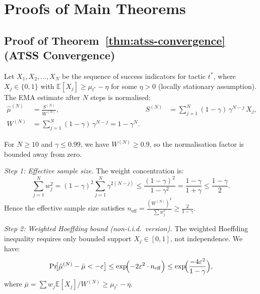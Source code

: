 \documentclass[conference]{IEEEtran}
\begin{document}




\appendix

\section{Proofs of Main Theorems}
\label{app:proofs}

\subsection{Proof of Theorem~\ref{thm:atss-convergence} (ATSS Convergence)}

Let $X_1, X_2, \ldots, X_N$ be the sequence of success indicators
for tactic $t^*$, where $X_j \in \{0,1\}$ with
$\mathbb{E}[X_j] \geq \mu_{t^*} - \eta$ for some $\eta > 0$
(locally stationary assumption).  The EMA estimate after $N$ steps
is normalised:
\begin{equation}
  \begin{aligned}
  \hat{\mu}^{(N)} &= \frac{S^{(N)}}{W^{(N)}}, &
  S^{(N)} &= \sum_{j=1}^{N} (1{-}\gamma)\,\gamma^{N-j}\,X_j, \\
  W^{(N)} &= \sum_{j=1}^{N} (1{-}\gamma)\,\gamma^{N-j}
    = 1 - \gamma^N.
  \end{aligned}
\end{equation}

For $N \geq 10$ and $\gamma \leq 0.99$, we have $W^{(N)} \geq 0.9$,
so the normalisation factor is bounded away from zero.

\emph{Step 1: Effective sample size.}
The weight concentration is:
\[
  \sum_{j=1}^{N} w_j^2
  = (1{-}\gamma)^2 \sum_{j=1}^{N} \gamma^{2(N-j)}
  \leq \frac{(1{-}\gamma)^2}{1 - \gamma^2}
  = \frac{1-\gamma}{1+\gamma}
  \leq \frac{1-\gamma}{2}.
\]
Hence the effective sample size satisfies
$n_{\mathrm{eff}} = \frac{(W^{(N)})^2}{\sum w_j^2}
  \geq \frac{2}{1-\gamma}$.

\emph{Step 2: Weighted Hoeffding bound (non-i.i.d.\ version).}
The weighted Hoeffding inequality requires only bounded support
$X_j \in [0,1]$, not independence.  We have:
\[
  \Pr\!\bigl[\hat{\mu}^{(N)} - \bar{\mu} < -\varepsilon\bigr]
  \leq \exp\!\Bigl(-2\varepsilon^2 \cdot n_{\mathrm{eff}}\Bigr)
  \leq \exp\!\Bigl(\frac{-4\varepsilon^2}{1-\gamma}\Bigr),
\]
where $\bar{\mu} = \sum w_j \mathbb{E}[X_j] / W^{(N)}
  \geq \mu_{t^*} - \eta$.
\end{document}

